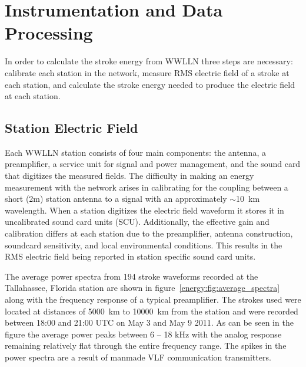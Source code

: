 \section{Instrumentation and Data Processing}

In order to calculate the stroke energy from WWLLN three steps are necessary: calibrate each station in the network, measure RMS electric field of a stroke at each station, and calculate the stroke energy needed to produce the electric field at each station.

\subsection{Station Electric Field}

Each WWLLN station consists of four main components: the antenna, a preamplifier, a service unit for signal and power management, and the sound card that digitizes the measured fields.
The difficulty in making an energy measurement with the network arises in calibrating for the coupling between a short (2m) station antenna to a signal with an approximately $\sim$10~km wavelength.
When a station digitizes the electric field waveform it stores it in uncalibrated sound card units (SCU).
Additionally, the effective gain and calibration differs at each station due to the preamplifier, antenna construction, soundcard sensitivity, and local environmental conditions.
This results in the RMS electric field being reported in station specific sound card units.

The average power spectra from 194 stroke waveforms recorded at the Tallahassee, Florida station are shown in figure~\ref{energy:fig:average_spectra} along with the frequency response of a typical preamplifier.
The strokes used were located at distances of 5000~km to 10000~km from the station and were recorded between 18:00 and 21:00 UTC on May 3 and May 9 2011.
As can be seen in the figure the average power peaks between 6 -- 18 kHz with the analog response remaining relatively flat through the entire frequency range.
The spikes in the power spectra are a result of manmade VLF communication transmitters.


